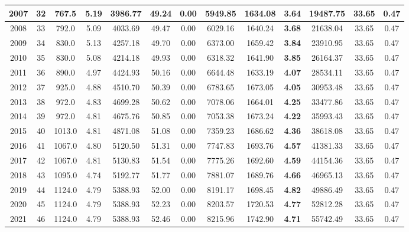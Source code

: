 {\begin{center}
\begin{tabular}[htb]{|c|c||c|c|c|c|c|c||c|c||c|c|c||}
\hline 
 2007 &  32 &  767.5 &  5.19 &  3986.77 &  49.24 &  0.00 &  5949.85 &  1634.08 &  {\bf 3.64} &  19487.75 &  33.65 &  0.47 \\ 
\hline 
 2008 &  33 &  792.0 &  5.09 &  4033.69 &  49.47 &  0.00 &  6029.16 &  1640.24 &  {\bf 3.68} &  21638.04 &  33.65 &  0.47 \\ 
\hline 
 2009 &  34 &  830.0 &  5.13 &  4257.18 &  49.70 &  0.00 &  6373.00 &  1659.42 &  {\bf 3.84} &  23910.95 &  33.65 &  0.47 \\ 
\hline 
 2010 &  35 &  830.0 &  5.08 &  4214.18 &  49.93 &  0.00 &  6318.32 &  1641.90 &  {\bf 3.85} &  26164.37 &  33.65 &  0.47 \\ 
\hline 
 2011 &  36 &  890.0 &  4.97 &  4424.93 &  50.16 &  0.00 &  6644.48 &  1633.19 &  {\bf 4.07} &  28534.11 &  33.65 &  0.47 \\ 
\hline 
 2012 &  37 &  925.0 &  4.88 &  4510.70 &  50.39 &  0.00 &  6783.65 &  1673.05 &  {\bf 4.05} &  30953.48 &  33.65 &  0.47 \\ 
\hline 
 2013 &  38 &  972.0 &  4.83 &  4699.28 &  50.62 &  0.00 &  7078.06 &  1664.01 &  {\bf 4.25} &  33477.86 &  33.65 &  0.47 \\ 
\hline 
 2014 &  39 &  972.0 &  4.81 &  4675.76 &  50.85 &  0.00 &  7053.38 &  1673.24 &  {\bf 4.22} &  35993.43 &  33.65 &  0.47 \\ 
\hline 
 2015 &  40 &  1013.0 &  4.81 &  4871.08 &  51.08 &  0.00 &  7359.23 &  1686.62 &  {\bf 4.36} &  38618.08 &  33.65 &  0.47 \\ 
\hline 
 2016 &  41 &  1067.0 &  4.80 &  5120.50 &  51.31 &  0.00 &  7747.83 &  1693.76 &  {\bf 4.57} &  41381.33 &  33.65 &  0.47 \\ 
\hline 
 2017 &  42 &  1067.0 &  4.81 &  5130.83 &  51.54 &  0.00 &  7775.26 &  1692.60 &  {\bf 4.59} &  44154.36 &  33.65 &  0.47 \\ 
\hline 
 2018 &  43 &  1095.0 &  4.74 &  5192.77 &  51.77 &  0.00 &  7881.07 &  1689.76 &  {\bf 4.66} &  46965.13 &  33.65 &  0.47 \\ 
\hline 
 2019 &  44 &  1124.0 &  4.79 &  5388.93 &  52.00 &  0.00 &  8191.17 &  1698.45 &  {\bf 4.82} &  49886.49 &  33.65 &  0.47 \\ 
\hline 
 2020 &  45 &  1124.0 &  4.79 &  5388.93 &  52.23 &  0.00 &  8203.57 &  1720.53 &  {\bf 4.77} &  52812.28 &  33.65 &  0.47 \\ 
\hline 
 2021 &  46 &  1124.0 &  4.79 &  5388.93 &  52.46 &  0.00 &  8215.96 &  1742.90 &  {\bf 4.71} &  55742.49 &  33.65 &  0.47 \\ 

\end{tabular}
\end{center}}
